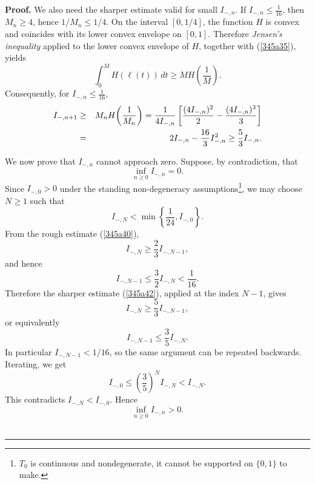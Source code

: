 \documentclass[onecolumn]{article}
\newenvironment{proof}[1][Proof]{\noindent\textbf{#1.} }{\ \rule{0.5em}{0.5em}}
\begin{document}
\begin{proof}
We also need the sharper estimate valid for small $I_{-,n}$. If $I_{-,n}\leq 
\frac{1}{16}$, then $M_{n}\geq 4$, hence $1/M_{n}\leq 1/4$. On the interval $%
[0,1/4]$, the function $H$ is convex and coincides with its lower convex
envelope on $[0,1]$. Therefore \textit{Jensen's inequality} applied to the
lower convex envelope of $H$, together with (\ref{345a35}), yields 
\begin{equation}
\int_{0}^{M}H(\ell (t))\,dt\geq MH\!\left( \frac{1}{M}\right) .
\label{345a41}
\end{equation}%
Consequently, for $I_{-,n}\leq \frac{1}{16}$, 
\begin{eqnarray}
I_{-,n+1} &\geq &M_{n}H\!\left( \frac{1}{M_{n}}\right) =\frac{1}{4I_{-,n}}%
\left[ \frac{(4I_{-,n})^{2}}{2}-\frac{(4I_{-,n})^{3}}{3}\right]  \notag \\
&=&2I_{-,n}-\frac{16}{3}I_{-,n}^{2}\geq \frac{5}{3}I_{-,n}.  \label{345a42}
\end{eqnarray}

We now prove that $I_{-,n}$ cannot approach zero. Suppose, by contradiction,
that 
\begin{equation}
\inf_{n\geq 0}I_{-,n}=0.  \label{345a42a}
\end{equation}%
Since $I_{-,0}>0$ under the standing non-degeneracy assumptions\footnote{$%
T_{0}${\footnotesize {} is continuous and nondegenerate, it cannot be
supported on }$\{0,1\}$ to make{\footnotesize .}}, we may choose $N\geq 1$
such that 
\begin{equation}
I_{-,N}<\min \left\{ \frac{1}{24},I_{-,0}\right\} .  \label{345a43}
\end{equation}%
From the rough estimate (\ref{345a40}), 
\begin{equation}
I_{-,N}\geq \frac{2}{3}I_{-,N-1},  \label{345a43a}
\end{equation}%
and hence 
\begin{equation}
I_{-,N-1}\leq \frac{3}{2}I_{-,N}<\frac{1}{16}.  \label{345a43b}
\end{equation}%
Therefore the sharper estimate (\ref{345a42}), applied at the index $N-1$,
gives 
\begin{equation}
I_{-,N}\geq \frac{5}{3}I_{-,N-1},  \label{345a43c}
\end{equation}%
or equivalently 
\begin{equation}
I_{-,N-1}\leq \frac{3}{5}I_{-,N}.  \label{345a43d}
\end{equation}%
In particular $I_{-,N-1}<1/16$, so the same argument can be repeated
backwards. Iterating, we get 
\begin{equation}
I_{-,0}\leq \left( \frac{3}{5}\right) ^{N}I_{-,N}<I_{-,N}.  \label{345a43e}
\end{equation}%
This contradicts $I_{-,N}<I_{-,0}$. Hence 
\begin{equation}
\inf_{n\geq 0}I_{-,n}>0.  \label{345a43f}
\end{equation}
\end{proof}
\end{document}
